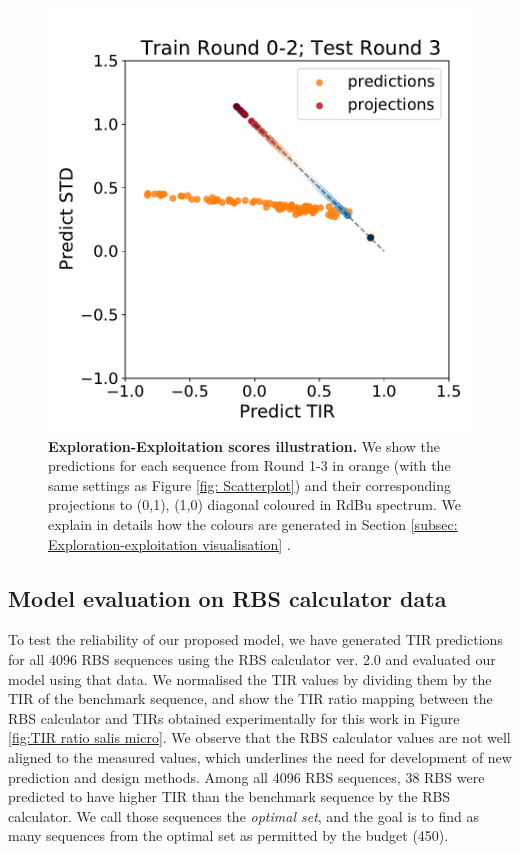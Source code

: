 \documentclass{scrartcl}[2013/05/29]%
\begin{document}
\begin{figure}[!ht]
    \includegraphics[scale=0.35]{plots/Supplementary/proj_scatter_abc1_FF_2.pdf}
   \caption{\textbf{Exploration-Exploitation scores illustration.} We show the predictions for each sequence from Round 1-3 in orange (with the same settings as Figure \mbox{\ref{fig: Scatterplot}}) and their corresponding projections to (0,1), (1,0) diagonal coloured in RdBu spectrum.
    We explain in details how the colours are generated in Section \ref{subsec: Exploration-exploitation visualisation} .
   }
   \label{fig:exploitationvsexplorationdetail}
\end{figure}

\subsection{Model evaluation on RBS calculator data}
\label{subsec: Model evaluation on RBS calculator data}

To test the reliability of our proposed model, we have generated TIR predictions for all 4096 RBS sequences using the RBS  calculator ver. 2.0 \mbox{\cite{Salis2009}} and evaluated our model using that data.
We normalised the TIR values by dividing them by the TIR of the benchmark sequence, and show the TIR ratio mapping between the RBS calculator and TIRs obtained experimentally for this work in Figure \mbox{\ref{fig:TIR ratio salis micro}}.
We observe that the RBS calculator values are not well aligned to the measured values, which underlines the need for development of new prediction and design methods. 
Among all 4096 RBS sequences, 38 RBS were predicted to have higher TIR than the benchmark sequence by the RBS calculator. We call those sequences the \textit{optimal set}, and the goal is to find as many sequences from the optimal set as permitted by the budget (450).
\end{document}
